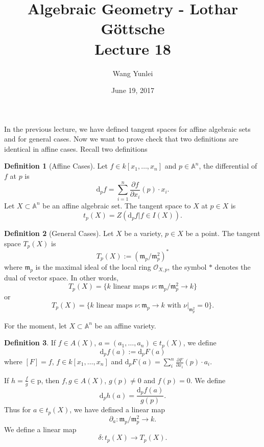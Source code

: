 \documentclass{amsart}
\theoremstyle{plain}
\theoremstyle{definition}
\newtheorem{definition}{Definition}
\theoremstyle{remark}
\numberwithin{equation}{section}
\begin{document}
\title[Complete-simple distributive lattices]
{Algebraic Geometry - Lothar G\"{o}ttsche \\
	Lecture 18}
\author{Wang Yunlei}
\date{June 19, 2017}
 
\maketitle
In the previous lecture, we have defined tangent spaces for affine algebraic sets and for general cases. Now we want to prove check that two definitions are identical in affine cases. Recall two definitions 
\begin{definition}[Affine Cases]
	Let $ f\in k [x_1,\dots,x_n] $ and $ p\in \mathbb{A}^n $, the differential of $ f $ at $ p $ is 
	$$
	\mathrm{d}_pf=\sum\limits_{i=1}^n\frac{\partial f}{\partial x_i}(p)\cdot x_i.
	$$
	Let $ X\subset \mathbb{A}^n $ be an affine algebraic set. The tangent space to $ X $ at $ p\in X $ is 
	$$
	t_p(X)=Z(\mathrm{d}_pf|f\in I(X)).
	$$
\end{definition}
\begin{definition}[General Cases]
	Let $ X $ be a variety, $ p\in X $ be a point. The tangent space $ T_p(X) $ is 
	$$
	T_p(X):=(\mathfrak{m}_p/\mathfrak{m}_p^2)^{\ast}
	$$
	where $ \mathfrak{m}_p $ is the maximal ideal of the local ring $ \mathcal{O}_{X,p} $, the symbol $ \ast $ denotes the dual of vector space. In other words, 
	$$
	T_p(X)=\lbrace k \text{ linear maps }\nu: \mathfrak{m}_p/\mathfrak{m}_p^2\to k \rbrace
	$$
	or 
	$$
	T_p(X)=\lbrace k \text{ linear maps }\nu: \mathfrak{m}_p\to k \text{ with } \nu|_{\mathfrak{m}_p^2}=0  \rbrace.
	$$
\end{definition}
For the moment, let $ X\subset \mathbb{A}^n $ be an affine variety.
\begin{definition}
	If $ f\in A(X) $, $ a=(a_1,\dots,a_n)\in t_p(X) $, we define
	$$
	\mathrm{d}_pf(a):=\mathrm{d}_pF(a) 
	$$
	where $ [F]=f $, $ f\in k[x_1,\dots,x_n] $ and $ \mathrm{d}_pF(a)=\sum\limits_{i}^n \frac{\partial F}{\partial x_i}(p)\cdot a_i $.
	
	If $ h=\frac{f}{g}\in \mathrm{p} $, then $ f,g\in A(X) $, $ g(p)\neq 0 $ and $ f(p)=0 $. We define 
	$$
	\mathrm{d}_ph(a)=\frac{\mathrm{d}_pf(a)}{g(p)}.
	$$
	Thus for $ a\in t_p(X) $, we have defined a linear map
	$$
	\partial_a:\mathfrak{m}_p/\mathfrak{m}_p^2\to k.
	$$
	We define a linear map
	$$
	\delta: t_p(X)\to T_p(X).
	$$
\end{definition}
\end{document}
